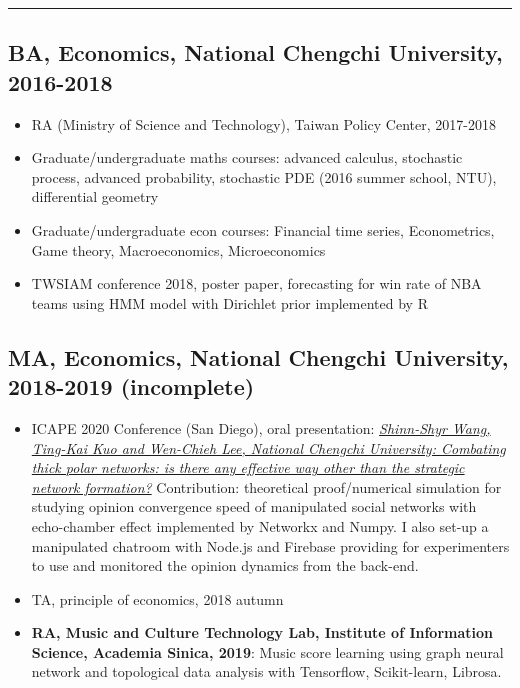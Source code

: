 \hrule

\columnbreak

\begin{educationbox}
\subsection*{BA, Economics, National Chengchi University, 2016-2018}

    \begin{itemize}[noitemsep]
        \item RA (Ministry of Science and Technology), Taiwan Policy Center, 2017-2018
        \item Graduate/undergraduate maths courses: advanced calculus, stochastic process, advanced probability, stochastic PDE (2016 summer school, NTU), differential geometry
        \item Graduate/undergraduate econ courses: Financial time series, Econometrics, Game theory, Macroeconomics, Microeconomics
        \item TWSIAM conference 2018, poster paper, forecasting for win rate of NBA teams using HMM model with Dirichlet prior implemented by R
    \end{itemize}


\subsection*{MA, Economics, National Chengchi University, 2018-2019 (incomplete)}

    \begin{itemize}[noitemsep]
        \item ICAPE 2020 Conference (San Diego), oral presentation: \href{https://ah.lib.nccu.edu.tw/item?item_id=163948&locale=en}{\textit{Shinn-Shyr Wang, Ting-Kai Kuo and Wen-Chieh Lee, National Chengchi University: Combating thick polar networks: is there any effective way other than the strategic network formation?}} Contribution: theoretical proof/numerical simulation for studying opinion convergence speed of manipulated social networks with echo-chamber effect implemented by Networkx and Numpy. I also set-up a manipulated chatroom with Node.js and Firebase providing for experimenters to use and monitored the opinion dynamics from the back-end.
        \item TA, principle of economics, 2018 autumn
    
        \item \textbf{RA, Music and Culture Technology Lab, Institute of Information Science, Academia Sinica, 2019}: Music score learning using graph neural network and topological data analysis with Tensorflow, Scikit-learn, Librosa.
        

\end{itemize}
\end{educationbox}
